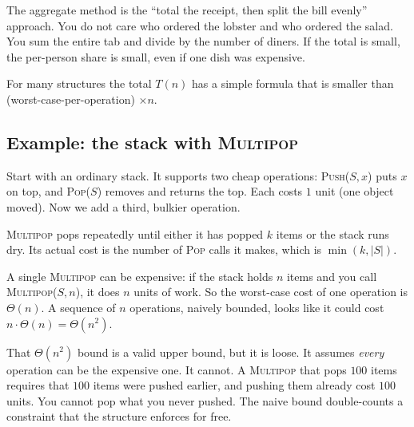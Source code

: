 \begin{intuitionbox}
The aggregate method is the ``total the receipt, then split the bill evenly''
approach. You do not care who ordered the lobster and who ordered the salad. You
sum the entire tab and divide by the number of diners. If the total is small, the
per-person share is small, even if one dish was expensive.
\end{intuitionbox}

For many structures the total $T(n)$ has a simple formula that is smaller than (worst-case-per-operation) $\times n$.

\subsection{Example: the stack with \textsc{Multipop}}

Start with an ordinary stack. It supports two cheap operations:
\textsc{Push}($S, x$) puts $x$ on top, and \textsc{Pop}($S$) removes and returns
the top. Each costs $1$ unit (one object moved). Now we add a third, bulkier
operation.

\begin{algorithm}[H]
\caption{\textsc{Multipop}($S, k$)}
\end{algorithm}

\textsc{Multipop} pops repeatedly until either it has popped $k$ items or the
stack runs dry. Its actual cost is the number of \textsc{Pop} calls it makes,
which is $\min(k, |S|)$.

A single \textsc{Multipop} can
be expensive: if the stack holds $n$ items and you call \textsc{Multipop}($S, n$),
it does $n$ units of work. So the worst-case cost of one operation is $\Theta(n)$.
A sequence of $n$ operations, naively bounded, looks like it could cost
$n \cdot \Theta(n) = \Theta(n^2)$.

\begin{trapbox}
That $\Theta(n^2)$ bound is a valid upper bound, but it is
loose. It assumes \emph{every} operation can be the expensive one. It cannot.
A \textsc{Multipop} that pops $100$ items requires that $100$ items were pushed
earlier, and pushing them already cost $100$ units. You cannot pop what you never
pushed. The naive bound double-counts a constraint that the structure enforces for
free.
\end{trapbox}

